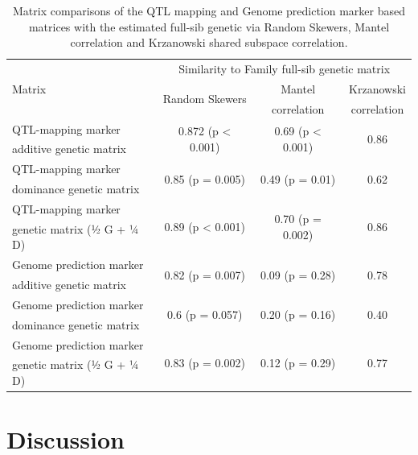 \begin{refsection}
\begin{table}[htbp]
	\caption[Matrix comparisons of the QTL and Genome
	prediction matrices]{Matrix comparisons of the QTL mapping and Genome
	prediction marker based matrices with the estimated full-sib genetic
	via Random Skewers, Mantel correlation and Krzanowski shared subspace
	correlation.}
	\vspace{1em}
	\centering
	\begin{tabular}{l|ccc}
	\toprule
	& \multicolumn{3}{c}{Similarity to Family full-sib genetic matrix} \\
\cline{2-4}
Matrix & \multirow{2}{*}{Random Skewers} & Mantel  & Krzanowski  \\
& & correlation & correlation \\
\midrule
QTL-mapping marker  & \multirow{2}{*}{0.872 (p \textless{} 0.001)} & \multirow{2}{*}{0.69 (p \textless{} 0.001)} & \multirow{2}{*}{0.86} \\
additive genetic matrix & & & \\
\cline{1-1}
QTL-mapping marker & \multirow{2}{*}{0.85 (p = 0.005)} & \multirow{2}{*}{0.49 (p = 0.01)} & \multirow{2}{*}{0.62} \\
 dominance genetic matrix & & & \\
\cline{1-1}
QTL-mapping marker  & \multirow{2}{*}{0.89 (p \textless{} 0.001)} & \multirow{2}{*}{0.70 (p = 0.002)} & \multirow{2}{*}{0.86} \\
genetic matrix (½ G + ¼ D) & & & \\
\cline{1-1}
Genome prediction marker & \multirow{2}{*}{0.82 (p = 0.007)} & \multirow{2}{*}{0.09 (p = 0.28)} & \multirow{2}{*}{0.78} \\
 additive genetic matrix  & & & \\
\cline{1-1}
Genome prediction marker & \multirow{2}{*}{0.6 (p = 0.057)} & \multirow{2}{*}{0.20 (p = 0.16)} & \multirow{2}{*}{0.40} \\
 dominance genetic matrix & & & \\
\cline{1-1}
Genome prediction marker & \multirow{2}{*}{0.83 (p = 0.002)} & \multirow{2}{*}{0.12 (p = 0.29)} & \multirow{2}{*}{0.77} \\
genetic matrix (½ G + ¼ D)  & & & \\
\bottomrule
	\end{tabular}
\end{table}

\section{Discussion}


\end{refsection}
